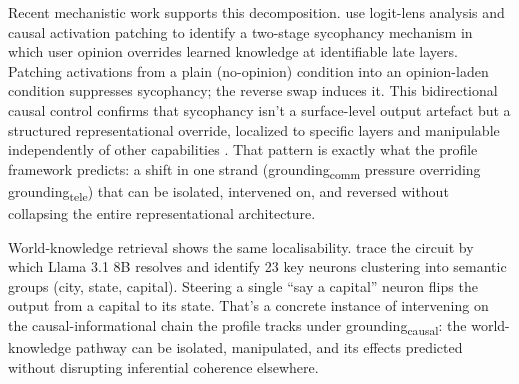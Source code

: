 \documentclass[12pt]{article}
\newcommand{\gtele}{grounding\textsubscript{tele}}
\newcommand{\gcausal}{grounding\textsubscript{causal}}
\newcommand{\gcomm}{grounding\textsubscript{comm}}
\begin{document}
Recent mechanistic work supports this decomposition. \textcite{wang_2025_truth_overridden_sycophancy} use logit-lens analysis and causal activation patching to identify a two-stage sycophancy mechanism in which user opinion overrides learned knowledge at identifiable late layers. Patching activations from a plain (no-opinion) condition into an opinion-laden condition suppresses sycophancy; the reverse swap induces it. This bidirectional causal control confirms that sycophancy isn't a surface-level output artefact but a structured representational override, localized to specific layers and manipulable independently of other capabilities \citep[see also][]{rimsky_2024_steering_sycophancy}. That pattern is exactly what the profile framework predicts: a shift in one strand (\gcomm{} pressure overriding \gtele{}) that can be isolated, intervened on, and reversed without collapsing the entire representational architecture.

World-knowledge retrieval shows the same localisability. \textcite{arora_2026_sparse_neuron_basis} trace the circuit by which Llama 3.1 8B resolves  and identify 23 key neurons clustering into semantic groups (city, state, capital). Steering a single \enquote{say a capital} neuron flips the output from a capital to its state. That's a concrete instance of intervening on the causal-informational chain the profile tracks under \gcausal{}: the world-knowledge pathway can be isolated, manipulated, and its effects predicted without disrupting inferential coherence elsewhere.
\end{document}
